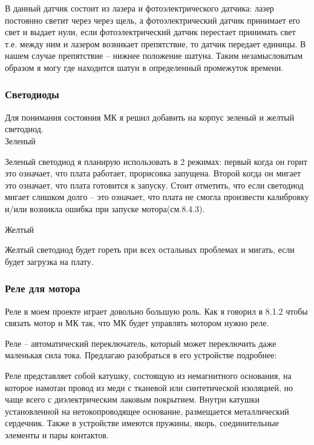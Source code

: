 \documentclass[a4paper, 12pt]{article}
\begin{document}
В данный датчик состоит из лазера и фотоэлектрического датчика: лазер постоянно
светит через через щель, а фотоэлектрический датчик принимает его свет и
выдает нули, если фотоэлектрический датчик перестает принимать свет т.е. между
ним и лазером возникает препятствие, то датчик передает единицы. В нашем случае
препятствие -- нижнее положение шатуна. Таким незамысловатым образом я могу
где находится шатун в определенный промежуток времени.


\subsubsection{Светодиоды}

Для понимания состояния МК я решил добавить на корпус зеленый и желтый
светодиод.\\
\textbf{$\text{Зеленый}$}

Зеленый светодиод я планирую использовать в 2 режимах: первый когда он
горит это означает, что плата работает, прорисовка запущена. Второй когда он
мигает это означает, что плата готовится к запуску. Стоит отметить, что если
светодиод мигает слишком долго -- это означает, что плата не смогла произвести
калибровку и/или возникла ошибка при запуске мотора(см.8.4.3).

\textbf{$\text{Желтый}$}

Желтый светодиод будет гореть при всех остальных проблемах и мигать, если будет
загрузка на плату.


\subsubsection{Реле для мотора}

Реле в моем проекте играет довольно большую роль. Как я говорил в 8.1.2
чтобы связать мотор и МК так, что МК будет управлять мотором нужно реле.


Реле -- автоматический переключатель, который может переключить даже маленькая
сила тока. Предлагаю разобраться в его устройстве подробнее:


Реле представляет собой катушку, состоящую из немагнитного основания, на
которое намотан провод из меди с тканевой или синтетической изоляцией, но чаще
всего с диэлектрическим лаковым покрытием. Внутри катушки установленной на
нетокопроводящее основание, размещается металлический сердечник. Также в
устройстве имеются пружины, якорь, соединительные элементы и пары контактов.
\end{document}

